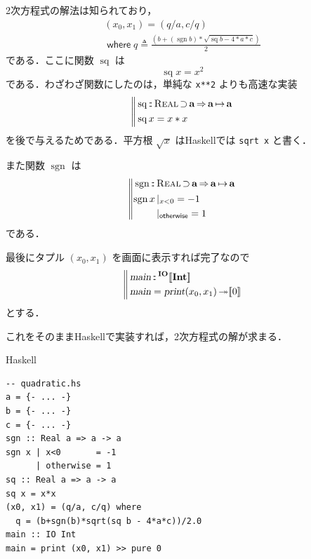\documentclass[a5paper,twoside,fleqn,draft]{jsbook}
\def\[{[\![}
\def\]{]\!]}
\DeclareMathOperator{\sgn}{sgn}
\newcommand{\programminglanguage}[1]{\textsf{#1}}
\newcommand{\haskell}{\programminglanguage{Haskell}}
\newcommand{\code}[1]{\texttt{#1}}
\newenvironment{haskellcode}{\begin{itembox}[r]{\haskell}}{\end{itembox}}
\newcommand{\mBrace}{\Vert}
\newcommand{\mKeyword}[1]{\mathsf{#1}}
\newcommand{\mOtherwiseKeyword}{\mKeyword{otherwise}}
\newcommand{\mWhereKeyword}{\mKeyword{where}}
\DeclareMathOperator{\mOtherwise}{\mOtherwiseKeyword}
\DeclareMathOperator{\mSuperClass}{\Rightarrow}
\DeclareMathOperator{\mSuperSet}{\supset}
\DeclareMathOperator{\mWhere}{\mWhereKeyword}
\newcommand{\mSpecialFunc}[1]{#1}
\DeclareMathOperator{\mSq}{\mSpecialFunc{sq}}
\newcommand{\mAction}[1]{\textsl{#1}}
\DeclareMathOperator{\mMain}{\mAction{main}}
\DeclareMathOperator{\mPrint}{\mAction{print}}
\DeclareMathOperator{\mBindRightIgnore}{\twoheadrightarrow}
\DeclareMathOperator{\mFuncArrow}{\mapsto}
\DeclareMathOperator{\mIn}{{:\!:}}
\DeclareMathOperator{\mLetEq}{\triangleq}
\newcommand{\mType}[1]{\mathbf{#1}} %
\newcommand{\mA}{\mType{a}}
\newcommand{\mIntType}{\mType{Int}}
\newcommand{\mTypeAssemble}[2]{{}^\mType{#1}\[\mType{#2}\]}
\newcommand{\mIOType}[1]{\mTypeAssemble{IO}{#1}}
\newcommand{\mIOIntType}{\mIOType{\mIntType}}
\newcommand{\mPureWith}[1]{\[#1\]}
\newcommand{\mTypeClass}[1]{\textsc{#1}} %
\newcommand{\mRealTypeClass}{\mTypeClass{Real}}
\newcommand{\mGuard}[1]{\mathop{\mid_{#1}}}
\newcommand{\mProjEXP}[2]{#1\mFuncArrow#2} %
\begin{document}
2次方程式の解法は知られており，
\begin{multline}
  (x_0,x_1)=(q/a,c/q)\\
  \mWhere q\mLetEq\frac{\left(b+(\sgn b)*\sqrt{\mSq b-4*a*c}\right)}{2}
\end{multline}
である．ここに関数 $\mSq$ は
\begin{equation}
  \mSq x=x^2
\end{equation}
である．わざわざ関数にしたのは，単純な \code{x**2} よりも高速な実装
\begin{equation}
  \left\mBrace
  \begin{aligned}
    &\mSq\mIn\mRealTypeClass\mSuperSet\mA
    \mSuperClass\mProjEXP{\mA}{\mA}\\
    &\mSq x=x*x
  \end{aligned}
  \right.
\end{equation}
を後で与えるためである．平方根 $\sqrt{x}$ は\haskell では \code{sqrt
  x} と書く．

また関数 $\sgn$ は
\begin{equation}
  \left\mBrace
  \begin{aligned}
    {}&\sgn\mIn{}\mRealTypeClass\mSuperSet\mA
    \mSuperClass\mProjEXP{\mA }{\mA }\\
    {}&
    \begin{aligned}
      \sgn x&\mGuard{x<0}=-1\\
      &\mGuard{\mOtherwise}=1
    \end{aligned}
  \end{aligned}
  \right.
\end{equation}
である．

最後にタプル $(x_0,x_1)$ を画面に表示すれば完了なので
\begin{equation}
  \left\mBrace
  \begin{aligned}
    {}&\mMain\mIn\mIOIntType\\
    {}&\mMain=\mPrint(x_0,x_1)\mBindRightIgnore\mPureWith{0}
  \end{aligned}
  \right.
\end{equation}
とする．

これをそのまま\haskell で実装すれば，2次方程式の解が求まる．
\begin{haskellcode}
\begin{verbatim}
-- quadratic.hs
a = {- ... -}
b = {- ... -}
c = {- ... -}
sgn :: Real a => a -> a
sgn x | x<0       = -1
      | otherwise = 1
sq :: Real a => a -> a
sq x = x*x
(x0, x1) = (q/a, c/q) where
  q = (b+sgn(b)*sqrt(sq b - 4*a*c))/2.0
main :: IO Int
main = print (x0, x1) >> pure 0
\end{verbatim}
\end{haskellcode}
\end{document}
